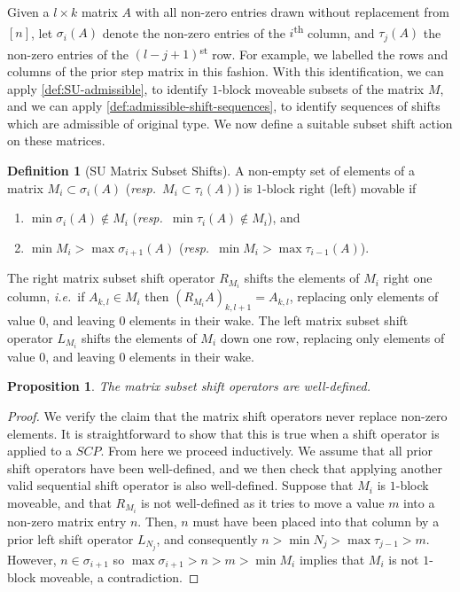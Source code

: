 \documentclass{amsart}
\newtheorem{proposition}[theorem]{Proposition}
\theoremstyle{definition}
\newtheorem{definition}[theorem]{Definition}
\newcommand{\ie}{\textit{i.e.}~} %
\newcommand{\resp}{\textit{resp.}~} %
\newcommand{\ordinal}{\textsuperscript{th}} %
\newcommand{\ordinalst}{\textsuperscript{st}} %
\begin{document}
Given a $l\times k$ matrix $A$ with all non-zero entries drawn without replacement from $[n]$, let $\sigma_i(A)$ denote the non-zero entries of the $i$\ordinal{} column, and $\tau_j(A)$ the non-zero entries of the $(l-j+1)$\ordinalst{} row. 
For example, we labelled the rows and columns of the prior step matrix in this fashion.
With this identification, we can apply \cref{def:SU-admissible}, to identify $1$-block moveable subsets of the matrix $M$, and we can apply \cref{def:admissible-shift-sequences}, to identify sequences of shifts which are admissible of original type.
We now define a suitable subset shift action on these matrices.
\begin{definition} [SU Matrix Subset Shifts]
A non-empty set of elements of a matrix $M_i \subset \sigma_i(A)$ (\resp $M_{i}\subset \tau_{i}(A)$) is $1$-block right (left) movable if
\begin{enumerate}
	\item $\min \sigma_i(A) \notin M_i$ (\resp $\min \tau_{i}(A) \notin M_i$), and
	\item $\min M_i> \max \sigma_{i+1}(A)$ (\resp $\min M_{i}> \max \tau_{i-1}(A)$).
\end{enumerate}
The right matrix subset shift operator $R_{M_i}$ shifts the elements of $M_i$ right one column, \ie if $A_{k,l} \in M_i$ then $(R_{M_i}A)_{k,l+1} = A_{k,l}$, replacing only elements of value $0$, and leaving $0$ elements in their wake.
The left matrix subset shift operator $L_{M_i}$ shifts the elements of $M_i$ down one row, replacing only elements of value $0$, and leaving $0$ elements in their wake.
\end{definition}
\begin{proposition}
The matrix subset shift operators are well-defined.
\end{proposition}
\begin{proof}
We verify the claim that the matrix shift operators never replace non-zero elements.
It is straightforward to show that this is true when a shift operator is applied to a $SCP$.
From here we proceed inductively.
We assume that all prior shift operators have been well-defined, and we then check that applying another valid sequential shift operator is also well-defined.
Suppose that $M_i$ is $1$-block moveable, and that $R_{M_i}$ is not well-defined as it tries to move a value $m$ into a non-zero matrix entry $n$.
Then, $n$ must have been placed into that column by a prior left shift operator $L_{N_j}$, and consequently $n>\min N_j > \max \tau_{j-1}> m$.
However, $n\in \sigma_{i+1}$ so $\max \sigma_{i+1}>n>m>\min M_i $ implies that $M_i$ is not $1$-block moveable, a contradiction.
\end{proof}
\end{document}
